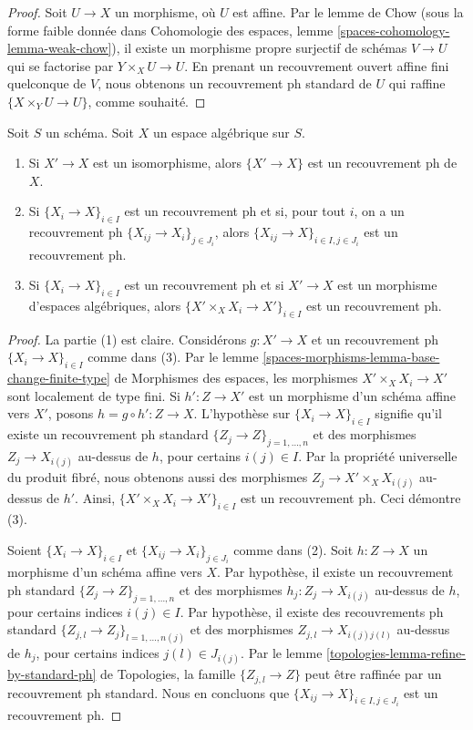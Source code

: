\begin{proof}
Soit $U \to X$ un morphisme, où $U$ est affine.
Par le lemme de Chow (sous la forme faible donnée dans
Cohomologie des espaces, lemme \ref{spaces-cohomology-lemma-weak-chow}),
il existe un morphisme propre surjectif de schémas
$V \to U$ qui se factorise par $Y \times_X U \to U$.
En prenant un recouvrement ouvert affine fini quelconque de $V$, nous obtenons un
recouvrement ph standard de $U$ qui raffine $\{X \times_Y U \to U\}$,
comme souhaité.
\end{proof}

\begin{lemma}
\label{lemma-ph}
Soit $S$ un schéma. Soit $X$ un espace algébrique sur $S$.
\begin{enumerate}
\item Si $X' \to X$ est un isomorphisme, alors $\{X' \to X\}$
est un recouvrement ph de $X$.
\item Si $\{X_i \to X\}_{i\in I}$ est un recouvrement ph et si, pour tout
$i$, on a un recouvrement ph $\{X_{ij} \to X_i\}_{j\in J_i}$, alors
$\{X_{ij} \to X\}_{i \in I, j\in J_i}$ est un recouvrement ph.
\item Si $\{X_i \to X\}_{i\in I}$ est un recouvrement ph
et si $X' \to X$ est un morphisme d'espaces algébriques, alors
$\{X' \times_X X_i \to X'\}_{i\in I}$ est un recouvrement ph.
\end{enumerate}
\end{lemma}

\begin{proof}
La partie (1) est claire. Considérons $g : X' \to X$ et
un recouvrement ph $\{X_i \to X\}_{i\in I}$ comme dans (3). Par le
lemme \ref{spaces-morphisms-lemma-base-change-finite-type} de Morphismes des espaces,
les morphismes $X' \times_X X_i \to X'$ sont localement de type fini.
Si $h' : Z \to X'$ est un morphisme d'un schéma affine
vers $X'$, posons $h = g \circ h' : Z \to X$. L'hypothèse
sur $\{X_i \to X\}_{i\in I}$ signifie qu'il existe un recouvrement ph standard
$\{Z_j \to Z\}_{j = 1, \ldots, n}$ et des morphismes $Z_j \to X_{i(j)}$ au-dessus de
$h$, pour certains $i(j) \in I$. Par la propriété universelle du produit fibré,
nous obtenons aussi des morphismes $Z_j \to X' \times_X X_{i(j)}$ au-dessus de $h'$.
Ainsi, $\{X' \times_X X_i \to X'\}_{i\in I}$ est un recouvrement ph.
Ceci démontre (3).

\medskip\noindent
Soient $\{X_i \to X\}_{i\in I}$ et $\{X_{ij} \to X_i\}_{j\in J_i}$ comme
dans (2). Soit $h : Z \to X$ un morphisme d'un schéma affine vers $X$.
Par hypothèse, il existe un recouvrement ph standard
$\{Z_j \to Z\}_{j = 1, \ldots, n}$ et des morphismes $h_j : Z_j \to X_{i(j)}$
au-dessus de $h$, pour certains indices $i(j) \in I$. Par hypothèse, il existe des
recouvrements ph standard
$\{Z_{j, l} \to Z_j\}_{l = 1, \ldots, n(j)}$
et des morphismes $Z_{j, l} \to X_{i(j)j(l)}$ au-dessus de
$h_j$, pour certains indices $j(l) \in J_{i(j)}$. Par le
lemme \ref{topologies-lemma-refine-by-standard-ph} de Topologies,
la famille $\{Z_{j, l} \to Z\}$ peut être raffinée par un recouvrement ph standard.
Nous en concluons que $\{X_{ij} \to X\}_{i \in I, j\in J_i}$
est un recouvrement ph.
\end{proof}

